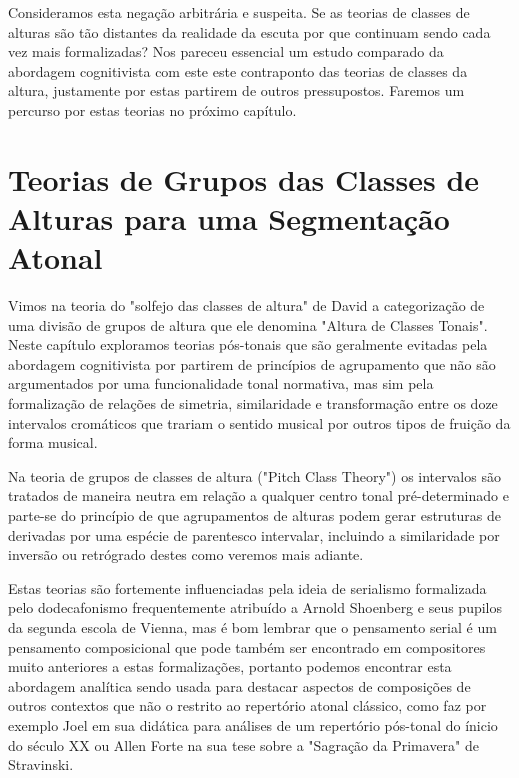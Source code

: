 \documentclass[
	12pt,				%
	openright,			%
	twoside,			%
	a4paper,			%
	english,			%
	french,				%
	spanish,			%
	brazil				%
	]{abntex2}
\begin{document}
Consideramos esta negação arbitrária e suspeita. Se as teorias de classes de alturas são tão distantes da realidade da escuta por que continuam sendo cada vez mais formalizadas? Nos pareceu essencial um estudo comparado da abordagem cognitivista com este este contraponto das teorias de classes da altura, justamente por estas partirem de outros pressupostos. Faremos um percurso por estas teorias no próximo capítulo.


\chapter{Teorias de Grupos das Classes de Alturas para uma Segmentação Atonal }
\label{modelos}

Vimos na teoria do "solfejo das classes de altura"\cite[p. 115]{temperley2001cognition} de David  a categorização de uma divisão de grupos de altura que ele denomina "Altura de Classes Tonais"\cite[p. 115]{temperley2001cognition}. Neste capítulo exploramos teorias pós-tonais que são geralmente evitadas pela abordagem cognitivista por partirem de princípios de agrupamento que não são argumentados por uma funcionalidade tonal normativa, mas sim pela formalização de relações de simetria, similaridade e transformação entre os doze intervalos cromáticos que trariam o sentido musical por outros tipos de fruição da forma musical. 

Na teoria de grupos de classes de altura ("Pitch Class Theory") os intervalos são tratados de maneira neutra em relação a qualquer centro tonal pré-determinado e parte-se do princípio de que agrupamentos de alturas podem gerar estruturas de derivadas por uma espécie de parentesco intervalar, incluindo a similaridade por inversão ou retrógrado destes como veremos mais adiante. 

Estas teorias são fortemente influenciadas pela ideia de serialismo formalizada pelo dodecafonismo frequentemente atribuído a Arnold Shoenberg e seus pupilos da segunda escola de Vienna, mas é bom lembrar que o pensamento serial é um pensamento composicional que pode também ser encontrado em compositores muito anteriores a estas formalizações, portanto podemos encontrar esta abordagem analítica sendo usada para destacar aspectos de composições de outros contextos que não o restrito ao repertório atonal clássico, como faz por exemplo Joel  em sua didática para análises de um repertório pós-tonal do ínicio do século XX ou Allen Forte na sua tese sobre a "Sagração da Primavera" de Stravinski\cite{forte1978harmonic}.
\end{document}
